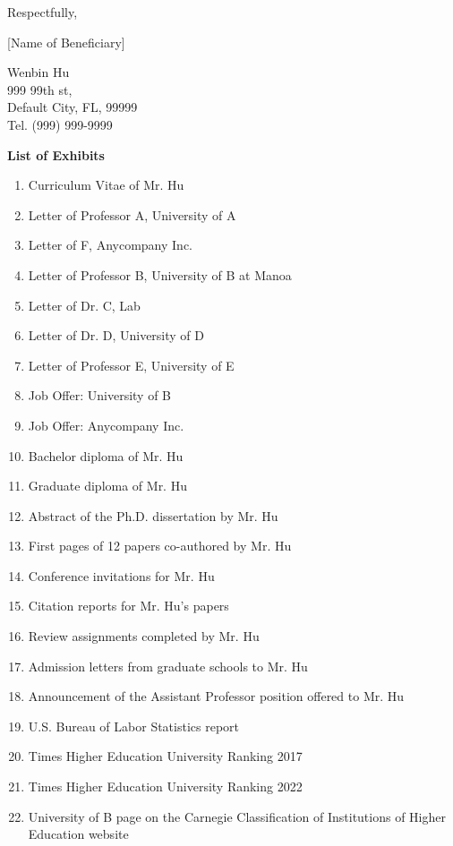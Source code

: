 \documentclass{article}
\begin{document}
Respectfully,

[Name of Beneficiary]

\vspace{5\baselineskip}

Wenbin Hu\\
999 99th st,\\
Default City, FL, 99999\\
Tel. (999) 999-9999


\clearpage

{\bf List of Exhibits}
\label{exhib}

\begin{enumerate}[label={Exhibit \arabic*:}]
    \item Curriculum Vitae of Mr. Hu 
    \item Letter of Professor A, University of A 
    \item Letter of F, Anycompany Inc. 
    \item Letter of Professor B, University of B at Manoa 
    \item Letter of Dr. C, Lab 
    \item Letter of Dr. D, University of D 
    \item Letter of Professor E, University of E
    \item Job Offer: University of B
    \item Job Offer: Anycompany Inc.
    \item Bachelor diploma of Mr. Hu 
    \item Graduate diploma of Mr. Hu 
    \item Abstract of the Ph.D. dissertation by Mr. Hu 
    \item First pages of 12 papers co-authored by Mr. Hu 
    \item Conference invitations for Mr. Hu 
    \item Citation reports for Mr. Hu’s papers 
    \item Review assignments completed by Mr. Hu 
    \item Admission letters from graduate schools to Mr. Hu 
    \item Announcement of the Assistant Professor position offered to Mr. Hu 
    \item U.S. Bureau of Labor Statistics report 
    \item Times Higher Education University Ranking 2017 
    \item Times Higher Education University Ranking 2022 
    \item University of B page on the Carnegie Classification of Institutions of Higher Education website 

\end{enumerate}
\end{document}
